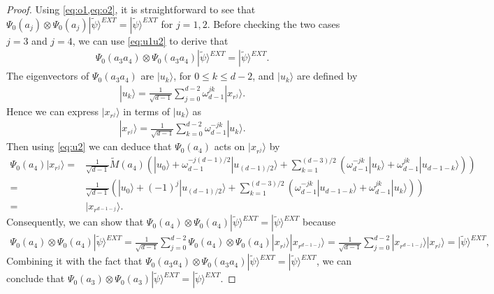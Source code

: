 \documentclass[11pt,letterpaper]{article}
\newcommand{\ket}[1]{|#1\rangle}
\newcommand{\x}{\otimes}
\newcommand{\1}{\mathbb{1}}
\newcommand{\EXT}{EXT}
\newcommand{\tM}{\tilde{M}}
\newcommand{\tpsi}{\tilde{\psi}}
\theoremstyle{definition}
\begin{document}
\begin{proof}
	Using \cref{eq:o1,eq:o2}, it is straightforward to see that $\Psi_0(a_j)\x \Psi_0(a_j) \ket{\tpsi}^{\EXT} = \ket{\tpsi}^{\EXT}$ for $j = 1,2$.
	Before checking the two cases $j=3$ and $j=4$, we can use \cref{eq:u1u2} to derive that
	\begin{align*}
		\Psi_0(a_3 a_4) \x\Psi_0(a_3 a_4) \ket{\tpsi}^{\EXT} = \ket{\tpsi}^{\EXT}.
	\end{align*}
	The eigenvectors of $\Psi_0(a_3 a_4)$ are $\ket{u_k}$,
	for $0 \leq k \leq d-2$,
	and $\ket{u_k}$ are defined by
    \begin{align*}
        \ket{u_k} = \frac{1}{\sqrt{d-1}} \sum_{j=0}^{d-2} \omega_{d-1}^{jk} \ket{x_{r^j}}.
    \end{align*}
    Hence we can express $\ket{x_{r^j}}$ in terms of $\ket{u_k}$ as 
    \begin{align*}
        \ket{x_{r^j}} = \frac{1}{\sqrt{d-1}} \sum_{k=0}^{d-2} \omega_{d-1}^{-jk} \ket{u_k}.
    \end{align*}
    Then using \cref{eq:u2} we can deduce that $\Psi_0(a_4)$ acts on $\ket{x_{r^j}}$ by
    \begin{align*}
        \Psi_0(a_4) \ket{x_{r^j}} =& \frac{1}{\sqrt{d-1}} \tM(a_4) \left(\ket{u_0} + \omega_{d-1}^{-j(d-1)/2}\ket{u_{(d-1)/2}}  + 
        \sum_{k=1}^{(d-3)/2} (\omega_{d-1}^{-jk} \ket{u_k} + \omega_{d-1}^{jk} \ket{u_{d-1-k}})\right) \\
        =&\frac{1}{\sqrt{d-1}} \left(\ket{u_0} + (-1)^j\ket{u_{(d-1)/2}}  + 
        \sum_{k=1}^{(d-3)/2} (\omega_{d-1}^{-jk} \ket{u_{d-1-k}} + \omega_{d-1}^{jk} \ket{u_{k}})\right) \\
        =& \ket{x_{r^{d-1-j}}}.
    \end{align*}
    Consequently, we can show that $\Psi_0(a_4) \x \Psi_0(a_4) \ket{\tpsi}^{\EXT} = \ket{\tpsi}^{\EXT}$ 
    because
    \begin{align*}
        \Psi_0(a_4) \x \Psi_0(a_4) \ket{\tpsi}^{\EXT} = \frac{1}{\sqrt{d-1}}  \sum_{j=0}^{d-2} \Psi_0(a_4)\x  \Psi_0(a_4) \ket{x_{r^j}} \ket{x_{r^{d-1-j}}} 
        = \frac{1}{\sqrt{d-1}} \sum_{j=0}^{d-2} \ket{x_{r^{d-1-j}}} \ket{x_{r^{j}}} =\ket{\tpsi}^{\EXT},
    \end{align*}
	Combining it with the fact that $\Psi_0(a_3 a_4) \x \Psi_0(a_3 a_4) \ket{\tpsi}^{\EXT} = \ket{\tpsi}^{\EXT}$, we can conclude that
	$\Psi_0(a_3) \x \Psi_0(a_3) \ket{\tpsi}^{\EXT} = \ket{\tpsi}^{\EXT}$.
\end{proof}


\end{document}
